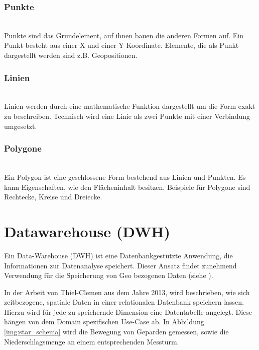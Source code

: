\documentclass[10pt,conference,compsocconf]{IEEEtran}
\begin{document}
\subsubsection{Punkte}\hspace*{\fill} \\
Punkte sind das Grundelement, auf ihnen bauen die anderen Formen auf. Ein Punkt besteht aus einer X und einer Y Koordinate. Elemente, die als Punkt dargestellt werden sind z.B. Geopositionen.\vspace{.5em}

\subsubsection{Linien}\hspace*{\fill} \\
Linien werden durch eine mathematische Funktion dargestellt um die Form exakt zu beschreiben. Technisch wird eine Linie als zwei Punkte mit einer Verbindung umgesetzt.\vspace{.5em}

\subsubsection{Polygone}\hspace*{\fill} \\
Ein Polygon ist eine geschlossene Form bestehend aus Linien und Punkten. Es kann Eigenschaften, wie den Flächeninhalt besitzen. Beispiele für Polygone sind Rechtecke, Kreise und Dreiecke.


\section{Datawarehouse (DWH)}
Ein Data-Warehouse (DWH) ist eine Datenbankgestützte Anwendung, die Informationen zur Datenanalyse speichert. Dieser Ansatz findet zunehmend Verwendung für die Speicherung von Geo bezogenen Daten (siehe \cite{Kelling2009} \cite{McGuire2008} \cite{olap}).\par

In der Arbeit von Thiel-Clemen\cite{ThielClemen2013} aus dem Jahre 2013, wird beschrieben, wie sich zeitbezogene, spatiale Daten in einer relationalen Datenbank speichern lassen.\\
Hierzu wird für jede zu speichernde Dimension eine Datentabelle angelegt. Diese hängen von dem Domain spezifischen Use-Case ab. In Abbildung \ref{img:star_schema} wird die Bewegung von Geparden gemessen, sowie die Niederschlagsmenge an einem entsprechenden Messturm.
\end{document}
